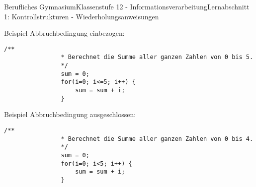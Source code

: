 \documentclass[11pt,oneside,openany,headings=optiontotoc,11pt,numbers=noenddot]{article}
\begin{document}
\begin{worksheet}{Berufliches Gymnasium}{Klassenstufe 12 - Informationsverarbeitung}{Lernabschnitt 1: Kontrollstrukturen - Wiederholungsanweisungen}
\begin{minipage}[t]{0.48\textwidth}
			\vspace*{0pt}
			Beispiel Abbruchbedingung einbezogen:
			\begin{lstlisting}[style=JavaInputStyle,frame=single]
				/**
				* Berechnet die Summe aller ganzen Zahlen von 0 bis 5.
				*/
				sum = 0;
				for(i=0; i<=5; i++) {
					sum = sum + i;
				}
			\end{lstlisting}
		\end{minipage}
		\hfill
		\begin{minipage}[t]{0.48\textwidth}
			\vspace*{0pt}
			Beispiel Abbruchbedingung ausgeschlossen:
			\begin{lstlisting}[style=JavaInputStyle,frame=single]
				/**
				* Berechnet die Summe aller ganzen Zahlen von 0 bis 4.
				*/
				sum = 0;
				for(i=0; i<5; i++) {
					sum = sum + i;
				}
			\end{lstlisting}
		\end{minipage}

\end{worksheet}
\end{document}
